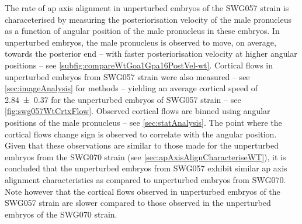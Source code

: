 The rate of \ac{ap} axis alignment in unperturbed embryos of the SWG057 strain is characeterised by measuring the posteriorisation velocity of the male pronucleus as a function of angular position of the male pronucleus in these embryos. In unperturbed embryos, the male pronucleus is observed to move, on average, towards the posterior end -- with faster posteriorisation velocity at higher angular positions  -- see \autoref{subfig:compareWtGoa1Gpa16PostVel-wt}. Cortical flows in unperturbed embryos from SWG057 strain were also measured -- see \autoref{sec:imageAnalysis} for methods -- yielding an average cortical speed of \SI{2.84 +- 0.37}{\unitCrtxVel} for the unperturbed embryos of SWG057 strain -- see \autoref{fig:swg057WtCrtxFlow}. Observed cortical flows are binned using angular positions of the male pronucleus -- see \autoref{sec:statAnalysis}. The point where the cortical flows change sign is observed to correlate with the angular position. Given that these observations are similar to those made for the unperturbed embryos from the SWG070 strain (see \autoref{sec:apAxisAlignCharacteriseWT}), it is concluded that the unperturbed embryos from SWG057 exhibit similar \ac{ap} axis alignment characteristics as compared to unperturbed embryos from SWG070. Note however that the cortical flows observed in unperturbed embryos of the SWG057 strain are slower compared to those observed in the unperturbed embryos of the SWG070 strain.

